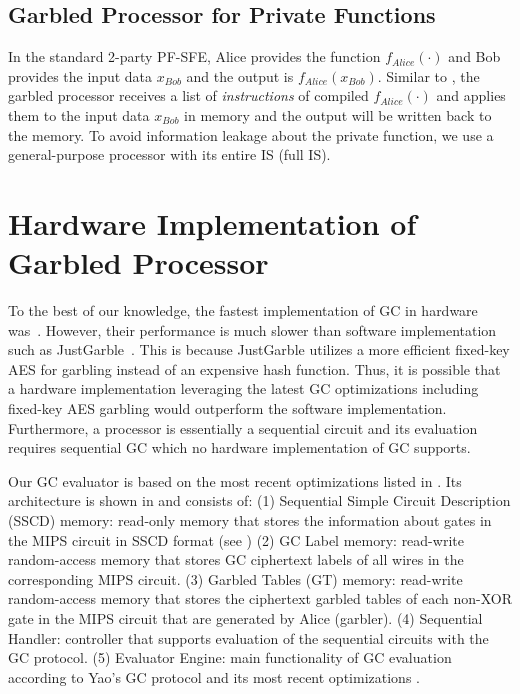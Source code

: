 \subsection{Garbled Processor for Private Functions}\label{ssec:processor-mips-sfe-private}
In the standard 2-party PF-SFE, Alice provides the function $f_{Alice}(\cdot)$ and Bob provides the input data $x_{Bob}$ and the output is $f_{Alice}(x_{Bob})$.
Similar to , the garbled processor receives a list of \emph{instructions} of compiled $f_{Alice}(\cdot)$ and applies them to the input data $x_{Bob}$ in memory and the output will be written back to the memory.
To avoid information leakage about the private function, we use a general-purpose processor with its entire IS (full IS).

\section{Hardware Implementation of Garbled Processor}\label{sec:processor-hardware}
To the best of our knowledge, the fastest implementation of GC in hardware was~\cite{jarvinen2010garbled}.
However, their performance is much slower than software implementation such as JustGarble~\cite{bellare2013efficient}.
This is because JustGarble utilizes a more efficient fixed-key AES for garbling instead of an expensive hash function.
Thus, it is possible that a hardware implementation leveraging the latest GC optimizations including fixed-key AES garbling would outperform the software implementation.
Furthermore, a processor is essentially a sequential circuit and its evaluation requires sequential GC which no hardware implementation of GC supports.

Our GC evaluator is based on the most recent optimizations listed in .
Its architecture is shown in  and consists of:
(1) Sequential Simple Circuit Description (SSCD) memory: read-only memory that stores the information about gates in the MIPS circuit in SSCD format (see )
(2) GC Label memory: read-write random-access memory that stores GC ciphertext labels of all wires in the corresponding MIPS circuit.
(3) Garbled Tables (GT) memory: read-write random-access memory that stores the ciphertext garbled tables of each non-XOR gate in the MIPS circuit that are generated by Alice (garbler).
(4) Sequential Handler: controller that supports evaluation of the sequential circuits with the GC protocol.
(5) Evaluator Engine: main functionality of GC evaluation according to Yao's GC protocol and its most recent optimizations \cite{kolesnikov2008improved, bellare2013efficient, zahur2015two, songhori2015tinygarble}.

